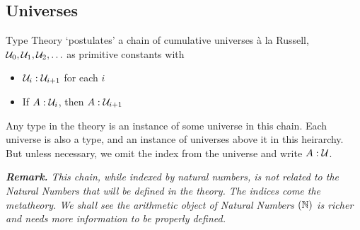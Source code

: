\subsection{Universes}

Type Theory `postulates' a chain of cumulative universes à la Russell,
  $\mathcal{U}_0, \mathcal{U}_1, \mathcal{U}_2, \ldots$ as primitive constants
with
\begin{itemize}
  \item $\mathcal{U}_i : \mathcal{U}_{i+1}$ for each $i$ 
  \item If $A : \mathcal{U}_i$, then $A : \mathcal{U}_{i+1}$ 
\end{itemize}
Any type in the theory is an instance of some universe in this chain. Each universe is also a type,
and an instance of universes above it in this heirarchy. But unless necessary, we omit the index from
the universe and write $A : \mathcal{U}$.

\textit{\textbf{Remark.} This chain, while indexed by natural numbers, is not related to the Natural 
Numbers that will be defined in the theory. The indices come the metatheory.
We shall see the arithmetic object of Natural Numbers $(\mathbb{N})$ is richer and needs more
information to be properly defined.}
